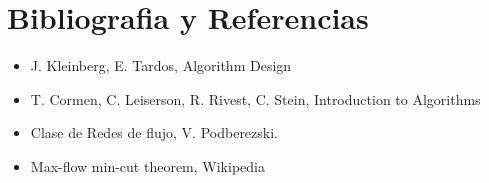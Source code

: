 \section{Bibliografia y Referencias}
\begin{itemize}
    \item J. Kleinberg, E. Tardos, Algorithm Design
    \item T. Cormen, C. Leiserson, R. Rivest, C. Stein, Introduction to Algorithms
    \item Clase de Redes de flujo, V. Podberezski.
    \item Max-flow min-cut theorem, Wikipedia
    
\end{itemize}
